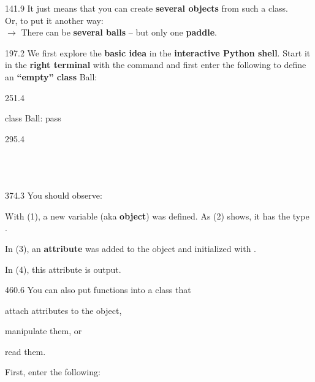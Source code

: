 \documentclass{aslab}
\newcommand*\inp[1]{\makebox[26.4bp][l]{\ttfamily(#1)}}
\newcommand*\codexi[1]{\fontsize{11bp}{#1bp}\ttfamily\lineskiplimit=-\maxdimen}
\begin{document}
\begin{region}[pitch=13.9]{141.9}
It just means that you can create \textbf{several objects} from such a
class.\\
Or, to put it another way:\\
$\rightarrow$ There can be \textbf{several balls} -- but only one
\textbf{paddle}.
\end{region}

\begin{region}[pitch=13.8]{197.2}
We first explore the \textbf{basic idea} in the \textbf{interactive Python
shell}. Start it in the \textbf{right terminal} with the command
 and first enter the following to define an \textbf{``empty''
class} Ball:
\end{region}

\begin{region}[pitch=13.2]{251.4}
\begin{codeblock}[basicstyle=\codexi{13.2}]
class Ball:
    pass
\end{codeblock}
\end{region}

\begin{region}[pitch=13.2]{295.4}
\\
\inp{1}\\
\inp{2}\\
\inp{3}\\
\inp{4}
\end{region}

\begin{region}[pitch=13.7]{374.3}
You should observe:
\begin{dashlist}
\item With (1), a new variable (aka \textbf{object})  was
  defined. As (2) shows, it has the type .
\item In (3), an \textbf{attribute}  was added to the object
   and initialized with .
\item In (4), this attribute  is output.
\end{dashlist}
\end{region}

\begin{region}[pitch=13.2]{460.6}
You can also put functions into a class that
\begin{dashlist}
\item attach attributes to the object,
\item manipulate them, or
\item read them.
\end{dashlist}
First, enter the following:
\end{region}
\end{document}
